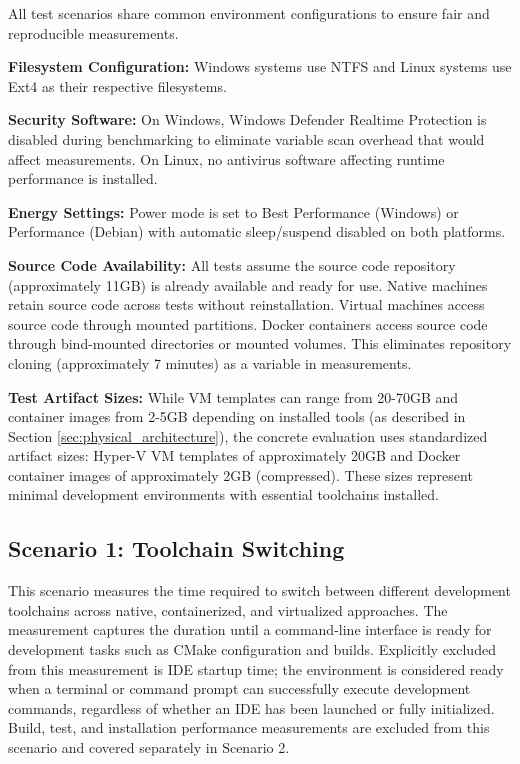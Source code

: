 All test scenarios share common environment configurations to ensure fair and reproducible measurements.

\textbf{Filesystem Configuration:}
Windows systems use NTFS and Linux systems use Ext4 as their respective filesystems.

\textbf{Security Software:}
On Windows, Windows Defender Realtime Protection is disabled during benchmarking to eliminate variable scan overhead that would affect measurements.
On Linux, no antivirus software affecting runtime performance is installed.

\textbf{Energy Settings:}
Power mode is set to Best Performance (Windows) or Performance (Debian) with automatic sleep/suspend disabled on both platforms.

\textbf{Source Code Availability:}
All tests assume the source code repository (approximately 11GB) is already available and ready for use.
Native machines retain source code across tests without reinstallation.
Virtual machines access source code through mounted partitions.
Docker containers access source code through bind-mounted directories or mounted volumes.
This eliminates repository cloning (approximately 7 minutes) as a variable in measurements.

\textbf{Test Artifact Sizes:}
While VM templates can range from 20-70GB and container images from 2-5GB depending on installed tools (as described in Section \ref{sec:physical_architecture}), the concrete evaluation uses standardized artifact sizes: Hyper-V VM templates of approximately 20GB and Docker container images of approximately 2GB (compressed).
These sizes represent minimal development environments with essential toolchains installed.

\subsection{Scenario 1: Toolchain Switching}

This scenario measures the time required to switch between different development toolchains across native, containerized, and virtualized approaches.
The measurement captures the duration until a command-line interface is ready for development tasks such as CMake configuration and builds.
Explicitly excluded from this measurement is IDE startup time; the environment is considered ready when a terminal or command prompt can successfully execute development commands, regardless of whether an IDE has been launched or fully initialized.
Build, test, and installation performance measurements are excluded from this scenario and covered separately in Scenario 2.

